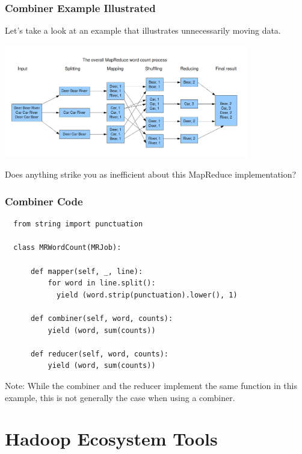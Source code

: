 \documentclass{beamer}
\begin{document}
\begin{frame}
  \frametitle{Combiner Example Illustrated}
  Let's take a look at an example that illustrates unnecessarily moving data. \pause
  \begin{center}
    \includegraphics[width=0.8\textwidth]{../images/word_count.png} \pause
  \end{center}
  Does anything strike you as inefficient about this MapReduce implementation?
\end{frame}

\begin{frame}[fragile]
  \frametitle{Combiner Code}
  \begin{lstlisting}
  from string import punctuation

  class MRWordCount(MRJob):
    
      def mapper(self, _, line):
          for word in line.split():
            yield (word.strip(punctuation).lower(), 1)

      def combiner(self, word, counts):
          yield (word, sum(counts))

      def reducer(self, word, counts):
          yield (word, sum(counts))
  \end{lstlisting}
  \alert{Note}: While the combiner and the reducer implement the same function in this example, this is not generally the case when using a combiner.
\end{frame}

\section{Hadoop Ecosystem Tools}
\end{document}
